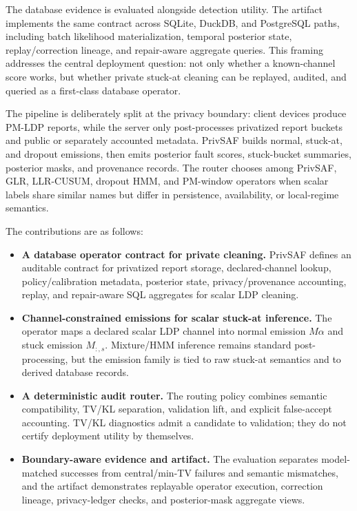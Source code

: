 \documentclass[conference]{IEEEtran}
\begin{document}
The database evidence is evaluated alongside detection utility. The artifact implements the same contract across SQLite, DuckDB, and PostgreSQL paths, including batch likelihood materialization, temporal posterior state, replay/correction lineage, and repair-aware aggregate queries. This framing addresses the central deployment question: not only whether a known-channel score works, but whether private stuck-at cleaning can be replayed, audited, and queried as a first-class database operator.

The pipeline is deliberately split at the privacy boundary: client devices produce PM-LDP reports, while the server only post-processes privatized report buckets and public or separately accounted metadata. PrivSAF builds normal, stuck-at, and dropout emissions, then emits posterior fault scores, stuck-bucket summaries, posterior masks, and provenance records. The router chooses among PrivSAF, GLR, LLR-CUSUM, dropout HMM, and PM-window operators when scalar labels share similar names but differ in persistence, availability, or local-regime semantics.

The contributions are as follows:
\begin{itemize}
    \item \textbf{A database operator contract for private cleaning.} PrivSAF defines an auditable contract for privatized report storage, declared-channel lookup, policy/calibration metadata, posterior state, privacy/provenance accounting, replay, and repair-aware SQL aggregates for scalar LDP cleaning.
    \item \textbf{Channel-constrained emissions for scalar stuck-at inference.} The operator maps a declared scalar LDP channel into normal emission \(M\alpha\) and stuck emission \(M_{:,s}\). Mixture/HMM inference remains standard post-processing, but the emission family is tied to raw stuck-at semantics and to derived database records.
    \item \textbf{A deterministic audit router.} The routing policy combines semantic compatibility, TV/KL separation, validation lift, and explicit false-accept accounting. TV/KL diagnostics admit a candidate to validation; they do not certify deployment utility by themselves.
    \item \textbf{Boundary-aware evidence and artifact.} The evaluation separates model-matched successes from central/min-TV failures and semantic mismatches, and the artifact demonstrates replayable operator execution, correction lineage, privacy-ledger checks, and posterior-mask aggregate views.
\end{itemize}
\end{document}
